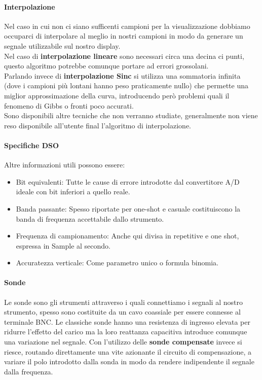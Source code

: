 \documentclass[12pt]{article}
\begin{document}
\paragraph{Interpolazione} Nel caso in cui non ci siano sufficenti campioni per la visualizzazione dobbiamo occuparci di interpolare al meglio in nostri campioni in modo da generare un segnale utilizzabile sul nostro display.\\
Nel caso di \textbf{interpolazione lineare} sono necessari circa una decina ci punti, questo algoritmo potrebbe comunque portare ad errori grossolani.\\
Parlando invece di \textbf{interpolazione Sinc} si utilizza una sommatoria infinita (dove i campioni più lontani hanno peso praticamente nullo) che permette una miglior approssimazione della curva, introducendo però problemi quali il fenomeno di Gibbs o fronti poco accurati.\\
Sono disponibili altre tecniche che non verranno studiate, generalmente non viene reso disponibile all'utente final l'algoritmo di interpolazione.

\paragraph{Specifiche DSO} Altre informazioni utili possono essere:
\begin{itemize}
  \item Bit equivalenti: Tutte le cause di errore introdotte dal convertitore A/D ideale con bit inferiori a quello reale.
  \item Banda passante: Spesso riportate per one-shot e casuale costituiscono la banda di frequenza accettabile dallo strumento.
  \item Frequenza di campionamento: Anche qui divisa in repetitive e one shot, espressa in Sample al secondo.
  \item Accuratezza verticale: Come parametro unico o formula binomia.
\end{itemize}

\paragraph{Sonde} Le sonde sono gli strumenti attraverso i quali connettiamo i segnali al nostro strumento, spesso sono costituite da un cavo coassiale per essere connesse al terminale BNC. Le classiche sonde hanno una resistenza di ingresso elevata per ridurre l'effetto del carico ma la loro reattanza capacitiva introduce comunque una variazione nel segnale. Con l'utilizzo delle \textbf{sonde compensate} invece si riesce, routando direttamente una vite azionante il circuito di compensazione, a variare il polo introdotto dalla sonda in modo da rendere indipendente il segnale dalla frequenza.
\end{document}
